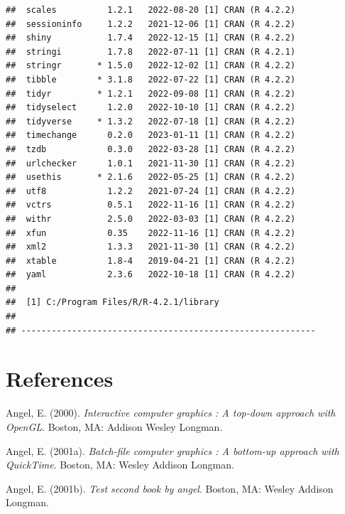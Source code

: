 \documentclass[print]{nuthesis}
\newlength{\cslhangindent}
\newenvironment{CSLReferences}[2]%
{\setlength{\parindent}{0pt}%
\everypar{\setlength{\hangindent}{\cslhangindent}}\ignorespaces}%
{\par}
\begin{document}
\begin{verbatim}
##  scales          1.2.1   2022-08-20 [1] CRAN (R 4.2.2)
##  sessioninfo     1.2.2   2021-12-06 [1] CRAN (R 4.2.2)
##  shiny           1.7.4   2022-12-15 [1] CRAN (R 4.2.2)
##  stringi         1.7.8   2022-07-11 [1] CRAN (R 4.2.1)
##  stringr       * 1.5.0   2022-12-02 [1] CRAN (R 4.2.2)
##  tibble        * 3.1.8   2022-07-22 [1] CRAN (R 4.2.2)
##  tidyr         * 1.2.1   2022-09-08 [1] CRAN (R 4.2.2)
##  tidyselect      1.2.0   2022-10-10 [1] CRAN (R 4.2.2)
##  tidyverse     * 1.3.2   2022-07-18 [1] CRAN (R 4.2.2)
##  timechange      0.2.0   2023-01-11 [1] CRAN (R 4.2.2)
##  tzdb            0.3.0   2022-03-28 [1] CRAN (R 4.2.2)
##  urlchecker      1.0.1   2021-11-30 [1] CRAN (R 4.2.2)
##  usethis       * 2.1.6   2022-05-25 [1] CRAN (R 4.2.2)
##  utf8            1.2.2   2021-07-24 [1] CRAN (R 4.2.2)
##  vctrs           0.5.1   2022-11-16 [1] CRAN (R 4.2.2)
##  withr           2.5.0   2022-03-03 [1] CRAN (R 4.2.2)
##  xfun            0.35    2022-11-16 [1] CRAN (R 4.2.2)
##  xml2            1.3.3   2021-11-30 [1] CRAN (R 4.2.2)
##  xtable          1.8-4   2019-04-21 [1] CRAN (R 4.2.2)
##  yaml            2.3.6   2022-10-18 [1] CRAN (R 4.2.2)
## 
##  [1] C:/Program Files/R/R-4.2.1/library
## 
## ----------------------------------------------------------
\end{verbatim}

\backmatter

\hypertarget{references}{%
\chapter*{References}\label{references}}

\noindent

\setlength{\parindent}{-0.20in}
\setlength{\leftskip}{0.20in}
\setlength{\parskip}{8pt}

\hypertarget{refs}{}
\begin{CSLReferences}{1}{0}
\leavevmode{}%
Angel, E. (2000). \emph{Interactive computer graphics : A top-down approach with OpenGL}. Boston, MA: Addison Wesley Longman.

\leavevmode{}%
Angel, E. (2001a). \emph{Batch-file computer graphics : A bottom-up approach with QuickTime}. Boston, MA: Wesley Addison Longman.

\leavevmode{}%
Angel, E. (2001b). \emph{Test second book by angel}. Boston, MA: Wesley Addison Longman.

\end{CSLReferences}
\end{document}
